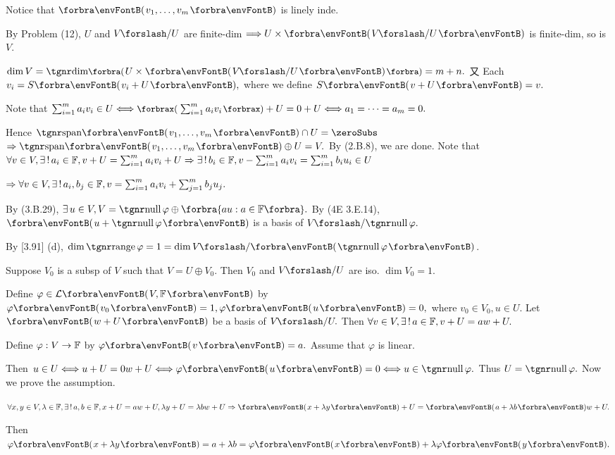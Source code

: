 Notice that $\Par{v_1,\dots,v_m}$ is linely inde.\par\quad
By Problem (12), $U$ and $V\XSlash U$ are finite-dim $\Longrightarrow U\times\Par{V\XSlash U}$ is finite-dim, so is $V$.\par\quad
$\dim V=\Dim\BigPar{U\times\Par{V\XSlash U}}=m+n.$ 又 Each $v_i=S\Par{v_i+U},$ where we define $S\Par{v+U}=v.$\par\quad
Note that $\sum_{i=1}^m a_i v_i\in U\Longleftrightarrow\XPar{\sum_{i=1}^m a_i v_i}+U=0+U\Longleftrightarrow a_1=\dots=a_m=0.$\vspace{4pt}\par\quad
Hence $\Span{v_1,\dots,v_m}\cap U=\zeroSubs$
$\Rightarrow\Span{v_1,\dots,v_m}\oplus U=V.$ By (2.B.8), we are done.\PfEnd\vspace{8pt}\quad
\Or Note that $\forall v\in V,\exists\,!\,a_i\in{\mathbb{F}},v+U=\sum_{i=1}^m a_i v_i+U\Rightarrow\exists\,!\,b_i\in{\mathbb{F}},v-\sum_{i=1}^m a_i v_i=\sum_{i=1}^m b_i u_i\in U$\vspace{4pt}\par\quad
{} $\Rightarrow \forall v\in V,\exists\,!\,a_i,b_j\in{\mathbb{F}},v=\sum_{i=1}^m a_i v_i+\sum_{j=1}^m b_j u_j.$\PfEnd
\SepLine

\par\quad
By (3.B.29), $\exists\,u\in V,V=\null\varphi\oplus\Bra{au:a\in\Fbb}.$ By (4E 3.E.14), $\Par{u+\null\varphi}$ is a basis of $V\XSlash \null\varphi.$\par\quad
\Or By [3.91] (d), $\dim\range\varphi=1=\dim V\XSlash \Par{\null \varphi}$.\PfEnd
\SepLine

\par\quad
Suppose $V_0$ is a subsp of $V$ such that $V=U\oplus V_0.$ Then $V_0$ and $V\XSlash U$ are iso. $\dim V_0=1.$\par\quad
Define $\varphi\in\Lm{V,\Fbb}$ by $\varphi\Par{v_0}=1,\varphi\Par{u}=0,$ where $v_0\in V_0,u\in U.$\PfEnd\vspace{6pt}\quad
\Or Let $\Par{w+U}$ be a basis of $V\XSlash U.$ Then $\forall v\in V,\exists\,!\,a\in{\mathbb{F}},v+U=aw+U.$\par\quad
Define $\varphi:{V\rightarrow{\mathbb{F}}}$ by $\varphi\Par{v}=a.$ Assume that $\varphi$ is linear.\par\quad
Then $u\in U\Longleftrightarrow u+U=0w+U\Longleftrightarrow\varphi\Par{u}=0\Longleftrightarrow u\in\null\varphi.$ Thus $U=\null\varphi.$\PfEnd\quad
Now we prove the assumption.\par\quad
$\forall x,y\in V,\lambda\in\Fbb,\exists\,!\,a,b\in\Fbb,x+U=a w+U,\lambda y+U=\lambda b w+U\Rightarrow \Par{x+\lambda y}+U=\Par{a+\lambda b}w+U.$\par\quad
Then $\varphi\Par{x+\lambda y}=a+\lambda b=\varphi\Par{x}+\lambda\varphi\Par{y}.$
\SepLine

